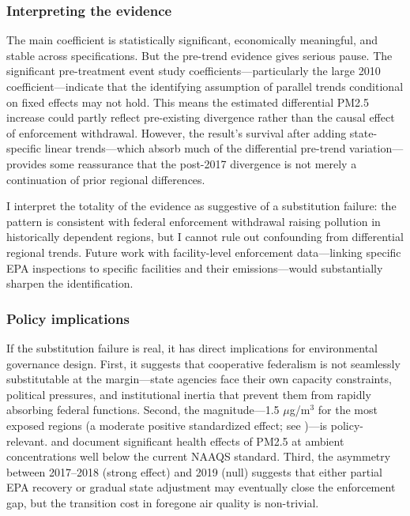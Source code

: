 \documentclass[12pt]{article}
\begin{document}
\subsubsection*{Interpreting the evidence} The main coefficient is statistically significant, economically meaningful, and stable across specifications. But the pre-trend evidence gives serious pause. The significant pre-treatment event study coefficients---particularly the large 2010 coefficient---indicate that the identifying assumption of parallel trends conditional on fixed effects may not hold. This means the estimated differential PM2.5 increase could partly reflect pre-existing divergence rather than the causal effect of enforcement withdrawal. However, the result's survival after adding state-specific linear trends---which absorb much of the differential pre-trend variation---provides some reassurance that the post-2017 divergence is not merely a continuation of prior regional differences.

I interpret the totality of the evidence as suggestive of a substitution failure: the pattern is consistent with federal enforcement withdrawal raising pollution in historically dependent regions, but I cannot rule out confounding from differential regional trends. Future work with facility-level enforcement data---linking specific EPA inspections to specific facilities and their emissions---would substantially sharpen the identification.

\subsubsection*{Policy implications} If the substitution failure is real, it has direct implications for environmental governance design. First, it suggests that cooperative federalism is not seamlessly substitutable at the margin---state agencies face their own capacity constraints, political pressures, and institutional inertia that prevent them from rapidly absorbing federal functions. Second, the magnitude---1.5 $\mu$g/m$^3$ for the most exposed regions (a moderate positive standardized effect; see )---is policy-relevant. \citet{pope2009fine} and \citet{di2017air} document significant health effects of PM2.5 at ambient concentrations well below the current NAAQS standard. Third, the asymmetry between 2017--2018 (strong effect) and 2019 (null) suggests that either partial EPA recovery or gradual state adjustment may eventually close the enforcement gap, but the transition cost in foregone air quality is non-trivial.
\end{document}
